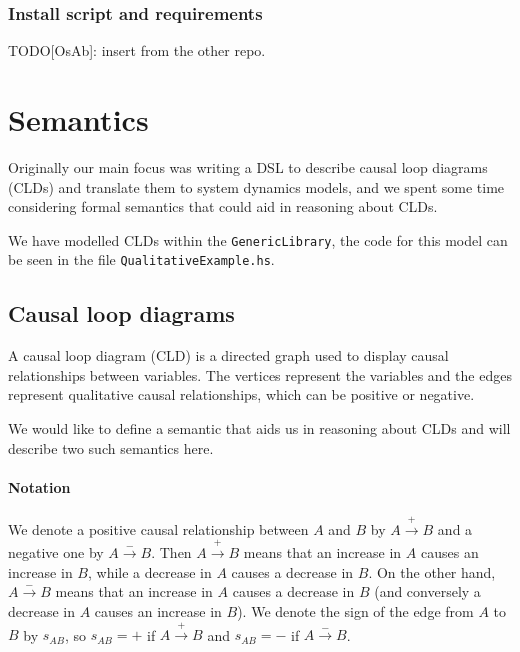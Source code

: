 \documentclass[]{article}
\begin{document}
\subsubsection{Install script and
requirements}\label{install-script-and-requirements}

TODO{[}OsAb{]}: insert from the other repo.

\section{Semantics}\label{semantics}
Originally our main focus was writing a DSL to describe causal loop diagrams (CLDs) and
translate them to system dynamics models, and we spent some time considering
formal semantics that could aid in reasoning about CLDs.

We have modelled CLDs within the \verb|GenericLibrary|, the code for this model
can be seen in the file \verb|QualitativeExample.hs|. \\

\subsection{Causal loop diagrams}

A causal loop diagram (CLD) is a directed graph used to display causal
relationships between variables.
%
The vertices represent the variables and the edges represent qualitative
causal relationships, which can be positive or negative.

We would like to define a semantic that aids us in reasoning about CLDs and will
describe two such semantics here.

\paragraph{Notation}
We denote a positive causal relationship between $A$ and $B$ by
$A\xrightarrow{+} B$ and a negative one by $A \xrightarrow{-} B$.
%
Then $A \xrightarrow{+} B$ means that an increase in $A$ causes an
increase in $B$, while a decrease in $A$ causes a decrease in $B$.
%
On the other hand, $A\xrightarrow{-} B$ means that an increase in $A$
causes a decrease in $B$ (and conversely a decrease in $A$ causes an
increase in $B$).
%
We denote the sign of the edge from $A$ to $B$ by $s_{AB}$, so
$s_{AB}= +$ if $A\xrightarrow{+} B$ and $s_{AB}=-$ if
$A\xrightarrow{-} B$.
\end{document}
